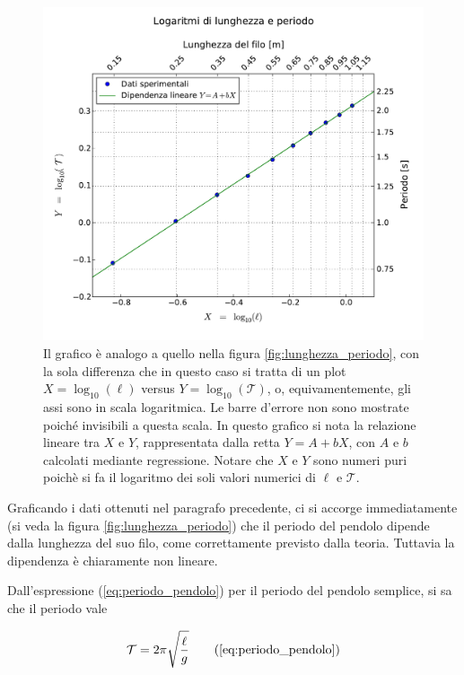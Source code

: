 \begin{figure}
    \centering
    \includegraphics[width=120mm]{immagini/log.pdf}
    \caption{Il grafico è analogo a quello nella figura \ref{fig:lunghezza_periodo}, con la sola differenza
        che in questo caso si tratta di un plot $X = \log_{10} (\ell)$ versus $Y = \log_{10} (\mathcal{T})$, o, equivamentemente,
        gli assi sono in scala logaritmica. Le barre d'errore non sono mostrate poiché invisibili a questa scala.
        In questo grafico si nota la relazione lineare tra $X$ e $Y$, rappresentata dalla retta $Y = A + bX$, con $A$ e $b$ calcolati
    mediante regressione. Notare che $X$ e $Y$ sono numeri puri poichè si fa il logaritmo dei soli valori numerici di $\ell$ e $\mathcal{T}$.}
    \label{fig:lunghezza_periodo_log}
\end{figure}

\label{l_pred_teo}

Graficando i dati ottenuti nel paragrafo precedente, ci si accorge immediatamente (si veda
la figura \ref{fig:lunghezza_periodo}) che il periodo del pendolo dipende dalla lunghezza
del suo filo, come correttamente previsto dalla teoria. Tuttavia la dipendenza è chiaramente non lineare.

Dall'espressione (\ref{eq:periodo_pendolo}) per il periodo del pendolo semplice, si sa che
il periodo vale

\begin{equation}
    \mathcal{T} = 2\pi\sqrt{\frac{\ell}{g}}
    \tag{\ref{eq:periodo_pendolo}}
\end{equation}

